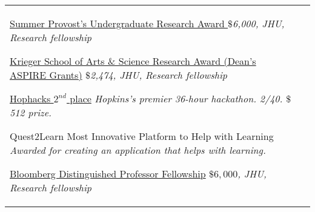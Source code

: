 \begin{paracol}{1}




  \begin{supertabular}{L{4cm}@{\hskip 0.3in}L{13cm}}
                {\href{https://hour.jhu.edu/opportunities/summerpura/}{Summer Provost’s Undergraduate Research Award }} %
                {\textit{$\$$6,000, JHU, Research fellowship}} %

                            {\href{https://krieger.jhu.edu/ursca/projects/aspire-grant/}{Krieger School of Arts \& Science Research Award (Dean's ASPIRE Grants)}} %
                            {\textit{$\$$2,474, JHU, Research fellowship}} %

                                        {\href{https://hophacks.com/}{Hophacks $2^{nd}$ place}} %
                                        {\textit{Hopkins's premier 36-hour hackathon. 2/40. $\$$512 prize.}} %

                                                    {Quest2Learn Most Innovative Platform to Help with Learning }
                                                    {\textit{Awarded for creating an application that helps with learning.}}


                                                                {\href{https://hour.jhu.edu/opportunities/bdpsp/}{Bloomberg Distinguished Professor Fellowship}}
                                                                {\textit{$\$6,000$, JHU, Research fellowship}}


\end{supertabular}
\end{paracol}
